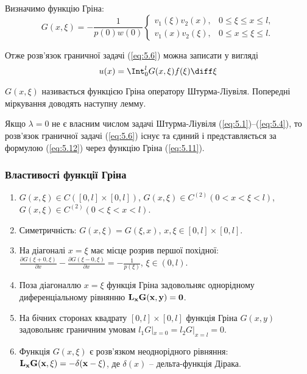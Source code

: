 Визначимо функцію Гріна:
\begin{equation}
    \label{eq:5.11}
    G(x, \xi) = - \dfrac{1}{p(0)w(0)} \begin{cases}
        v_1(\xi) v_2(x), & 0 \le \xi \le x \le l, \\
        v_1(x) v_2(\xi), & 0 \le x \le \xi \le l.
    \end{cases}
\end{equation}

Отже розв’язок граничної задачі (\ref{eq:5.6}) можна записати у вигляді
\begin{equation}
    \label{eq:5.12}
    u(x) = \Int_0^l G(x, \xi) f(\xi) \diff \xi
\end{equation}

$G(x, \xi)$ називається функцією Гріна оператору Штурма-Ліувіля. Попередні міркування доводять наступну лемму.
\begin{lemma}
    Якщо $\lambda = 0$ не є власним числом задачі Штурма-Ліувіля (\ref{eq:5.1})--(\ref{eq:5.4}), то розв’язок граничної задачі (\ref{eq:5.6}) існує та єдиний і представляється за формулою (\ref{eq:5.12}) через функцію Гріна (\ref{eq:5.11}).
\end{lemma}

\subsubsection{Властивості функції Гріна}
\begin{enumerate}
    \item $G(x, \xi) \in C([0, l] \times [0, l])$, $G(x, \xi) \in C^{(2)}(0 < x < \xi < l)$, $G(x, \xi) \in C^{(2)} (0 < \xi < x < l)$.
    \item Симетричність: $G(x, \xi) = G(\xi, x)$, $x, \xi \in [0, l] \times [0, l]$.
    \item На діагоналі $x = \xi$ має місце розрив першої похідної: $\frac{\partial G(\xi + 0, \xi)}{\partial x} - \frac{\partial G(\xi - 0, \xi)}{\partial x} = - \frac{1}{p(\xi)}$, $\xi\in(0, l)$. 
    \item Поза діагоналлю $x = \xi$ функція Гріна задовольняє однорідному диференціальному рівнянню $\bf{L}_x G(x, y) = 0$.
    \item На бічних сторонах квадрату $[0,l]\times[0,l]$ функція Гріна $G(x, y)$ задовольняє граничним умовам $l_1G|_{x=0}=l_2G|_{x=l}=0$.
    \item Функція $G(x,\xi)$ є розв’язком неоднорідного рівняння: $\bf{L}_xG(x,\xi)=-\delta(x-\xi)$, де $\delta(x)$ -- дельта-функція Дірака.
\end{enumerate}

